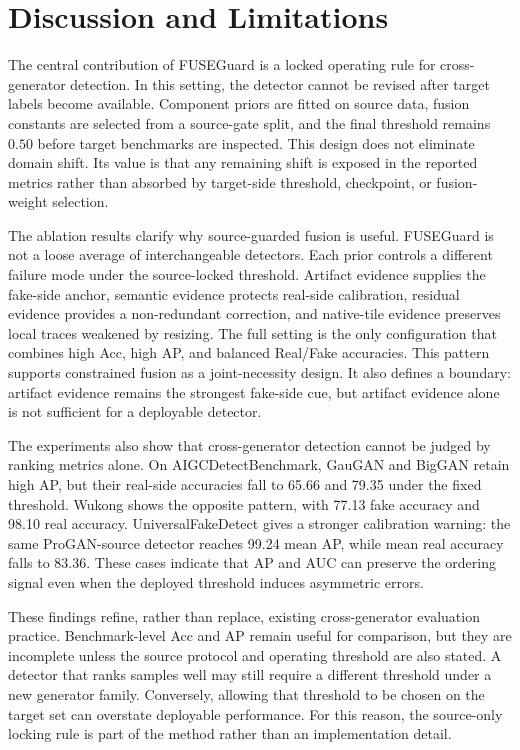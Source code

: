 \documentclass[letterpaper,journal]{IEEEtran}
\begin{document}
\section{Discussion and Limitations}
\label{sec:discussion}

The central contribution of FUSEGuard is a locked operating rule for cross-generator detection. In this setting, the detector cannot be revised after target labels become available. Component priors are fitted on source data, fusion constants are selected from a source-gate split, and the final threshold remains $0.50$ before target benchmarks are inspected. This design does not eliminate domain shift. Its value is that any remaining shift is exposed in the reported metrics rather than absorbed by target-side threshold, checkpoint, or fusion-weight selection.

The ablation results clarify why source-guarded fusion is useful. FUSEGuard is not a loose average of interchangeable detectors. Each prior controls a different failure mode under the source-locked threshold. Artifact evidence supplies the fake-side anchor, semantic evidence protects real-side calibration, residual evidence provides a non-redundant correction, and native-tile evidence preserves local traces weakened by resizing. The full setting is the only configuration that combines high Acc, high AP, and balanced Real/Fake accuracies. This pattern supports constrained fusion as a joint-necessity design. It also defines a boundary: artifact evidence remains the strongest fake-side cue, but artifact evidence alone is not sufficient for a deployable detector.

The experiments also show that cross-generator detection cannot be judged by ranking metrics alone. On AIGCDetectBenchmark, GauGAN and BigGAN retain high AP, but their real-side accuracies fall to 65.66 and 79.35 under the fixed threshold. Wukong shows the opposite pattern, with 77.13 fake accuracy and 98.10 real accuracy. UniversalFakeDetect gives a stronger calibration warning: the same ProGAN-source detector reaches 99.24 mean AP, while mean real accuracy falls to 83.36. These cases indicate that AP and AUC can preserve the ordering signal even when the deployed threshold induces asymmetric errors.

These findings refine, rather than replace, existing cross-generator evaluation practice. Benchmark-level Acc and AP remain useful for comparison, but they are incomplete unless the source protocol and operating threshold are also stated. A detector that ranks samples well may still require a different threshold under a new generator family. Conversely, allowing that threshold to be chosen on the target set can overstate deployable performance. For this reason, the source-only locking rule is part of the method rather than an implementation detail.
\end{document}
